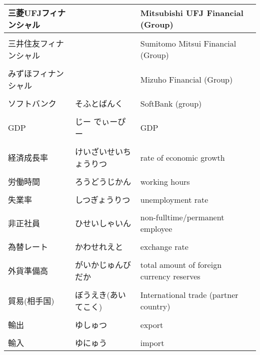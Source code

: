 \documentclass{article}
\begin{document}
\begin{tabular}{ l | l | p{7.5cm} }
三菱UFJフィナンシャル && Mitsubishi UFJ Financial (Group) \\ \hline \\[-1em]
三井住友フィナンシャル && Sumitomo Mitsui Financial (Group) \\ \hline \\[-1em]
みずほフィナンシャル && Mizuho Financial (Group) \\ \hline \\[-1em]
ソフトバンク & そふとばんく　& SoftBank (group) \\ \hline \\[-1em]
GDP & じー でぃーぴー & GDP \\ \hline \\[-1em]
経済成長率 & けいざいせいちょうりつ & rate of economic growth \\ \hline \\[-1em]
労働時間 & ろうどうじかん & working hours \\ \hline \\[-1em]
失業率 & しつぎょうりつ & unemployment rate \\ \hline \\[-1em]
非正社員 & ひせいしゃいん & non-fulltime/permanent employee\\ \hline \\[-1em]
為替レート & かわせれえと & exchange rate \\ \hline \\[-1em]
外貨準備高 & がいかじゅんびだか & total amount of foreign currency reserves \\ \hline \\[-1em]
貿易(相手国) & ぼうえき(あいてこく) & International trade (partner country)\\ \hline \\[-1em]
輸出 & ゆしゅつ & export \\ \hline \\[-1em]
輸入 & ゆにゅう & import \\ %
\end{tabular}
\end{document}
